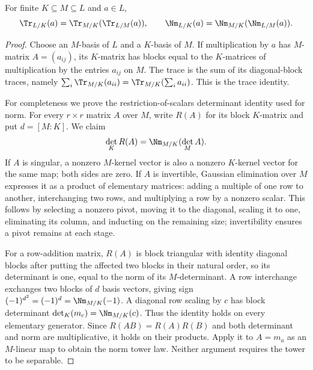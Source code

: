 \begin{theorem}
For finite $K\subseteq M\subseteq L$ and $a\in L$,
\[
\Tr_{L/K}(a)=\Tr_{M/K}(\Tr_{L/M}(a)),\qquad
\Nm_{L/K}(a)=\Nm_{M/K}(\Nm_{L/M}(a)).
\]
\end{theorem}
\begin{proof}
Choose an $M$-basis of $L$ and a $K$-basis of $M$. If multiplication by $a$ has $M$-matrix $A=(a_{ij})$, its $K$-matrix has blocks equal to the $K$-matrices of multiplication by the entries $a_{ij}$ on $M$. The trace is the sum of its diagonal-block traces, namely $\sum_i\Tr_{M/K}(a_{ii})=\Tr_{M/K}(\sum_i a_{ii})$. This is the trace identity.

For completeness we prove the restriction-of-scalars determinant identity used for norm. For every $r\times r$ matrix $A$ over $M$, write $R(A)$ for its block $K$-matrix and put $d=[M:K]$. We claim
\[\det_K R(A)=\Nm_{M/K}(\det_M A).\]
If $A$ is singular, a nonzero $M$-kernel vector is also a nonzero $K$-kernel vector for the same map; both sides are zero. If $A$ is invertible, Gaussian elimination over $M$ expresses it as a product of elementary matrices: adding a multiple of one row to another, interchanging two rows, and multiplying a row by a nonzero scalar. This follows by selecting a nonzero pivot, moving it to the diagonal, scaling it to one, eliminating its column, and inducting on the remaining size; invertibility ensures a pivot remains at each stage.

For a row-addition matrix, $R(A)$ is block triangular with identity diagonal blocks after putting the affected two blocks in their natural order, so its determinant is one, equal to the norm of its $M$-determinant. A row interchange exchanges two blocks of $d$ basis vectors, giving sign $(-1)^{d^2}=(-1)^d=\Nm_{M/K}(-1)$. A diagonal row scaling by $c$ has block determinant $\det_K(m_c)=\Nm_{M/K}(c)$. Thus the identity holds on every elementary generator. Since $R(AB)=R(A)R(B)$ and both determinant and norm are multiplicative, it holds on their products. Apply it to $A=m_a$ as an $M$-linear map to obtain the norm tower law. Neither argument requires the tower to be separable.
\end{proof}

